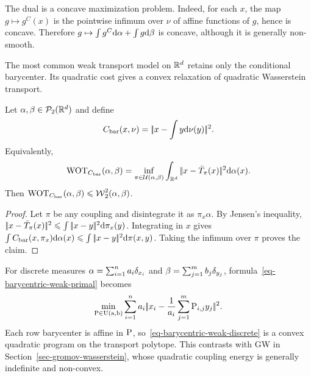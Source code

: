 The dual is a concave maximization problem. Indeed, for each $x$, the map $g\mapsto g^C(x)$ is the pointwise infimum over $\nu$ of affine functions of $g$, hence is concave. Therefore $g\mapsto\int g^C\d\alpha+\int g\d\beta$ is concave, although it is generally non-smooth.

The most common weak transport model on $\RR^d$ retains only the conditional barycenter. Its quadratic cost gives a convex relaxation of quadratic Wasserstein transport.

\begin{prop}\label{prop-barycentric-weak-ot}
	Let $\alpha,\beta\in\Pp_2(\RR^d)$ and define
	\[
		C_{\mathrm{bar}}(x,\nu)
		=
		\norm{x-\int y\d\nu(y)}^2.
	\]
	Equivalently,
	\begin{equation}\label{eq-barycentric-weak-primal}
		\WOT_{C_{\mathrm{bar}}}(\alpha,\beta)
		=
		\inf_{\pi\in\Couplings(\alpha,\beta)}
		\int_{\RR^d}\norm{x-\bar T_\pi(x)}^2\d\alpha(x).
	\end{equation}
	Then
	$\WOT_{C_{\mathrm{bar}}}(\alpha,\beta) \leq \Wass_2^2(\alpha,\beta)$.
\end{prop}

\begin{proof}
	Let $\pi$ be any coupling and disintegrate it as $\pi_x\alpha$. By Jensen's inequality,
	$\norm{x-\bar T_\pi(x)}^2 \leq \int\norm{x-y}^2\d\pi_x(y)$.
	Integrating in $x$ gives $\int C_{\mathrm{bar}}(x,\pi_x)\d\alpha(x)\leq\int\norm{x-y}^2\d\pi(x,y)$. Taking the infimum over $\pi$ proves the claim.
\end{proof}

For discrete measures $\alpha=\sum_{i=1}^n a_i\de_{x_i}$ and $\beta=\sum_{j=1}^m b_j\de_{y_j}$, formula~\eqref{eq-barycentric-weak-primal} becomes
\begin{equation}\label{eq-barycentric-weak-discrete}
	\min_{\P\in\CouplingsD(\a,\b)}
	\sum_{i=1}^n a_i
	\norm{x_i-\frac{1}{a_i}\sum_{j=1}^m\P_{i,j}y_j}^2.
\end{equation}
Each row barycenter is affine in $\P$, so~\eqref{eq-barycentric-weak-discrete} is a convex quadratic program on the transport polytope. This contrasts with GW in Section~\ref{sec-gromov-wasserstein}, whose quadratic coupling energy is generally indefinite and non-convex.

